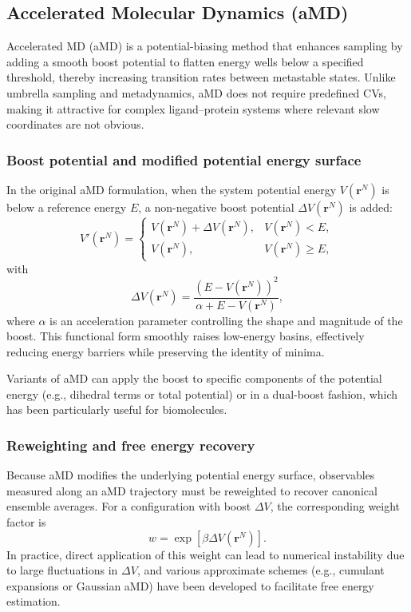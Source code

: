 \documentclass[12pt,a4paper]{article}
\begin{document}
\subsection{Accelerated Molecular Dynamics (aMD)}

Accelerated MD (aMD) is a potential-biasing method that enhances sampling by adding a smooth boost potential to flatten energy wells below a specified threshold, thereby increasing transition rates between metastable states.\cite{Hamelberg2004,Markwick2011} Unlike umbrella sampling and metadynamics, aMD does not require predefined CVs, making it attractive for complex ligand--protein systems where relevant slow coordinates are not obvious.

\subsubsection{Boost potential and modified potential energy surface}

In the original aMD formulation, when the system potential energy \(V(\mathbf{r}^N)\) is below a reference energy \(E\), a non-negative boost potential \(\Delta V(\mathbf{r}^N)\) is added:
\[
V'(\mathbf{r}^N) =
\begin{cases}
V(\mathbf{r}^N) + \Delta V(\mathbf{r}^N), & V(\mathbf{r}^N) < E, \\
V(\mathbf{r}^N), & V(\mathbf{r}^N) \geq E,
\end{cases}
\]
with
\[
\Delta V(\mathbf{r}^N) = \frac{\left(E - V(\mathbf{r}^N)\right)^2}{\alpha + E - V(\mathbf{r}^N)},
\]
where \(\alpha\) is an acceleration parameter controlling the shape and magnitude of the boost.\cite{Hamelberg2004} This functional form smoothly raises low-energy basins, effectively reducing energy barriers while preserving the identity of minima.

Variants of aMD can apply the boost to specific components of the potential energy (e.g., dihedral terms or total potential) or in a dual-boost fashion, which has been particularly useful for biomolecules.\cite{Markwick2011}

\subsubsection{Reweighting and free energy recovery}

Because aMD modifies the underlying potential energy surface, observables measured along an aMD trajectory must be reweighted to recover canonical ensemble averages. For a configuration with boost \(\Delta V\), the corresponding weight factor is
\[
w = \exp\left[\beta \Delta V(\mathbf{r}^N)\right].
\]
In practice, direct application of this weight can lead to numerical instability due to large fluctuations in \(\Delta V\), and various approximate schemes (e.g., cumulant expansions or Gaussian aMD) have been developed to facilitate free energy estimation.\cite{Miao2015}
\end{document}
